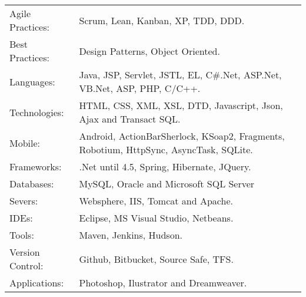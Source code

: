 \documentclass[a4paper, oneside, final]{scrartcl}
\begin{document}
\begin{center}
\begin{tabularx}{0.97\linewidth}{p{3.5cm}X}
Agile Practices: & Scrum, Lean, Kanban, XP, TDD, DDD.\\
Best Practices:  & Design Patterns, Object Oriented.\\
Languages:       & Java, JSP, Servlet, JSTL, EL, C\#.Net, ASP.Net, VB.Net, ASP, PHP, C/C++.\\
Technologies:    & HTML, CSS, XML, XSL, DTD, Javascript, Json, Ajax and Transact SQL.\\
Mobile:          & Android, ActionBarSherlock, KSoap2, Fragments, Robotium, HttpSync, AsyncTask, SQLite.\\
Frameworks:      & .Net until 4.5, Spring, Hibernate, JQuery.\\
Databases:       & MySQL, Oracle and Microsoft SQL Server \\
Severs:          & Websphere, IIS, Tomcat and Apache.\\
IDEs:            & Eclipse, MS Visual Studio, Netbeans.\\
Tools:			 & Maven, Jenkins, Hudson.\\
Version Control: & Github, Bitbucket, Source Safe, TFS.\\
Applications:    & Photoshop, Ilustrator and Dreamweaver.\\
\end{tabularx}


\end{center}
\end{document}

